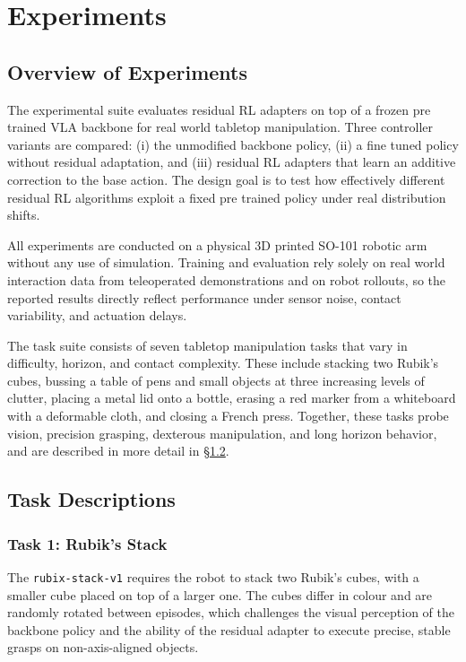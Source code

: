 \chapter{Experiments}

\section{Overview of Experiments}
\label{sec:exp_overview}

The experimental suite evaluates residual \ac{RL} adapters on top of a frozen pre trained \ac{VLA} backbone for real world tabletop manipulation. Three controller variants are compared: (i) the unmodified backbone policy, (ii) a fine tuned policy without residual adaptation, and (iii) residual \ac{RL} adapters that learn an additive correction to the base action. The design goal is to test how effectively different residual \ac{RL} algorithms exploit a fixed pre trained policy under real distribution shifts.

All experiments are conducted on a physical 3D printed SO-101 robotic arm without any use of simulation. Training and evaluation rely solely on real world interaction data from teleoperated demonstrations and on robot rollouts, so the reported results directly reflect performance under sensor noise, contact variability, and actuation delays.

The task suite consists of seven tabletop manipulation tasks that vary in difficulty, horizon, and contact complexity. These include stacking two Rubik's cubes, bussing a table of pens and small objects at three increasing levels of clutter, placing a metal lid onto a bottle, erasing a red marker from a whiteboard with a deformable cloth, and closing a French press. Together, these tasks probe vision, precision grasping, dexterous manipulation, and long horizon behavior, and are described in more detail in \S\ref{sec:task_descriptions}.

\section{Task Descriptions}
\label{sec:task_descriptions}

\subsection{Task 1: Rubik's Stack}

The \texttt{rubix-stack-v1} requires the robot to stack two Rubik's cubes, with a smaller cube placed on top of a larger one. The cubes differ in colour and are randomly rotated between episodes, which challenges the visual perception of the backbone policy and the ability of the residual adapter to execute precise, stable grasps on non-axis-aligned objects.

